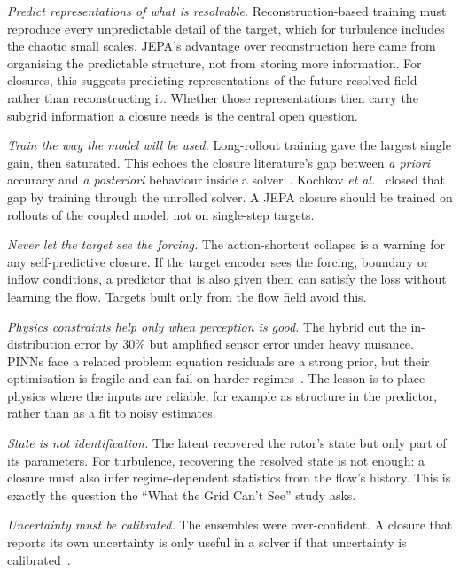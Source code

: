 \documentclass[10pt,journal]{IEEEtran}
\begin{document}
\emph{Predict representations of what is resolvable.} Reconstruction-based training must reproduce every unpredictable detail of the target, which for turbulence includes the chaotic small scales. JEPA's advantage over reconstruction here came from organising the predictable structure, not from storing more information. For closures, this suggests predicting representations of the future resolved field rather than reconstructing it. Whether those representations then carry the subgrid information a closure needs is the central open question.

\emph{Train the way the model will be used.} Long-rollout training gave the largest single gain, then saturated. This echoes the closure literature's gap between \emph{a priori} accuracy and \emph{a posteriori} behaviour inside a solver~\cite{duraisamy2021perspectives,beck2019les}. Kochkov \emph{et al.}~\cite{kochkov2021mlcfd} closed that gap by training through the unrolled solver. A JEPA closure should be trained on rollouts of the coupled model, not on single-step targets.

\emph{Never let the target see the forcing.} The action-shortcut collapse is a warning for any self-predictive closure. If the target encoder sees the forcing, boundary or inflow conditions, a predictor that is also given them can satisfy the loss without learning the flow. Targets built only from the flow field avoid this.

\emph{Physics constraints help only when perception is good.} The hybrid cut the in-distribution error by 30\% but amplified sensor error under heavy nuisance. PINNs face a related problem: equation residuals are a strong prior, but their optimisation is fragile and can fail on harder regimes~\cite{krishnapriyan2021failure,wang2021gradient}. The lesson is to place physics where the inputs are reliable, for example as structure in the predictor, rather than as a fit to noisy estimates.

\emph{State is not identification.} The latent recovered the rotor's state but only part of its parameters. For turbulence, recovering the resolved state is not enough: a closure must also infer regime-dependent statistics from the flow's history. This is exactly the question the ``What the Grid Can't See'' study asks.

\emph{Uncertainty must be calibrated.} The ensembles were over-confident. A closure that reports its own uncertainty is only useful in a solver if that uncertainty is calibrated~\cite{lakshminarayanan2017ensembles}.
\end{document}
